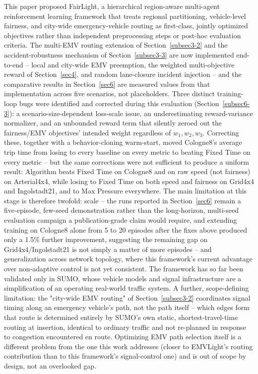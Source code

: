 \documentclass[3p,times]{elsarticle}
\theoremstyle{plain}
\theoremstyle{definition}
\begin{document}
This paper proposed FairLight, a hierarchical region-aware multi-agent
reinforcement learning framework that treats regional partitioning,
vehicle-level fairness, and city-wide emergency-vehicle routing as
first-class, jointly optimized objectives rather than independent
preprocessing steps or post-hoc evaluation criteria. The multi-EMV
routing extension of Section~\ref{subsec3-2} and the
accident-robustness mechanism of Section~\ref{subsec3-3} are now
implemented end-to-end -- local and city-wide EMV preemption, the
weighted multi-objective reward of Section~\ref{sec4}, and random
lane-closure incident injection -- and the comparative results in
Section~\ref{sec6} are measured values from that implementation across
five scenarios, not placeholders. Three distinct training-loop bugs
were identified and corrected during this evaluation
(Section~\ref{subsec6-3}): a scenario-size-dependent loss-scale issue,
an underestimating reward-variance normalizer, and an unbounded reward
term that silently zeroed out the fairness/EMV objectives' intended
weight regardless of $w_1, w_2, w_3$. Correcting these, together with
a behavior-cloning warm-start, moved Cologne8's average trip time from
losing to every baseline on every metric to beating Fixed Time on
every metric -- but the same corrections were not sufficient to
produce a uniform result: Algorithm beats Fixed Time on Cologne8 and
on raw speed (not fairness) on Arterial4x4, while losing to Fixed Time
on both speed and fairness on Grid4x4 and Ingolstadt21, and to Max
Pressure everywhere. The main limitation at this stage is therefore
twofold: scale -- the runs reported in Section~\ref{sec6} remain a
five-episode, few-seed demonstration rather than the long-horizon,
multi-seed evaluation campaign a publication-grade claim would
require, and extending training on Cologne8 alone from 5 to 20
episodes after the fixes above produced only a 1.5\% further
improvement, suggesting the remaining gap on Grid4x4/Ingolstadt21 is
not simply a matter of more episodes -- and generalization across
network topology, where this framework's current advantage over
non-adaptive control is not yet consistent. The framework has so far
been validated only in SUMO, whose vehicle models and signal
infrastructure are a simplification of an operating real-world
traffic system. A further, scope-defining limitation: the "city-wide
EMV routing" of Section~\ref{subsec3-2} coordinates signal timing
along an emergency vehicle's path, not the path itself -- which edges
form that route is determined entirely by SUMO's own static,
shortest-travel-time routing at insertion, identical to ordinary
traffic and not re-planned in response to congestion encountered en
route. Optimizing EMV path selection itself is a different problem
from the one this work addresses (closer to EMVLight's routing
contribution \cite{emvlight} than to this framework's signal-control
one) and is out of scope by design, not an overlooked gap.
\end{document}
